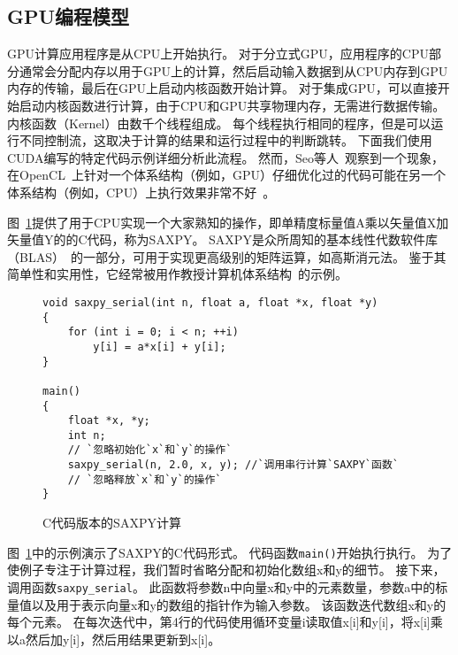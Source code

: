 \subsection{GPU编程模型}

GPU计算应用程序是从CPU上开始执行。
对于分立式GPU，应用程序的CPU部分通常会分配内存以用于GPU上的计算，然后启动输入数据到从CPU内存到GPU内存的传输，最后在GPU上启动内核函数开始计算。
对于集成GPU，可以直接开始启动内核函数进行计算，由于CPU和GPU共享物理内存，无需进行数据传输。
内核函数（Kernel）由数千个线程组成。
每个线程执行相同的程序，但是可以运行不同控制流，这取决于计算的结果和运行过程中的判断跳转。
下面我们使用CUDA编写的特定代码示例详细分析此流程。
然而，Seo等人~观察到一个现象，在OpenCL~上针对一个体系结构（例如，GPU）仔细优化过的代码可能在另一个体系结构（例如，CPU）上执行效果非常不好~。

图~\ref{fig:csaxpy}提供了用于CPU实现一个大家熟知的操作，即单精度标量值A乘以矢量值X加矢量值Y的的C代码，称为SAXPY。 
SAXPY是众所周知的基本线性代数软件库（BLAS）~的一部分，可用于实现更高级别的矩阵运算，如高斯消元法。 
鉴于其简单性和实用性，它经常被用作教授计算机体系结构~的示例。

\begin{figure}[htbp] 
  \centering
  \begin{lstlisting}[language={[ANSI]C}]
void saxpy_serial(int n, float a, float *x, float *y)
{
    for (int i = 0; i < n; ++i)
        y[i] = a*x[i] + y[i];
}

main() 
{
    float *x, *y;
    int n;
    // `忽略初始化`x`和`y`的操作`
    saxpy_serial(n, 2.0, x, y); //`调用串行计算`SAXPY`函数`
    // `忽略释放`x`和`y`的操作`
}
\end{lstlisting} 
\caption{C代码版本的SAXPY计算}
\label{fig:csaxpy}
\end{figure}



图~\ref{fig:csaxpy}中的示例演示了SAXPY的C代码形式。
代码函数\texttt{main()}开始执行执行。
为了使例子专注于计算过程，我们暂时省略分配和初始化数组x和y的细节。 
接下来，调用函数\texttt{saxpy\_serial}。 
此函数将参数n中向量x和y中的元素数量，参数a中的标量值以及用于表示向量x和y的数组的指针作为输入参数。 
该函数迭代数组x和y的每个元素。 
在每次迭代中，第4行的代码使用循环变量i读取值x[i]和y[i]，将x[i]乘以a然后加y[i]，然后用结果更新到x[i]。
 


